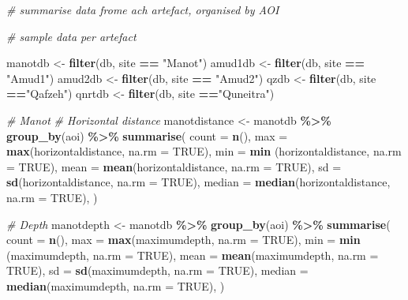 \documentclass[
]{article}
\newenvironment{Shaded}{\begin{snugshade}}{\end{snugshade}}
\newcommand{\AttributeTok}[1]{\textcolor[rgb]{0.13,0.29,0.53}{#1}}
\newcommand{\CommentTok}[1]{\textcolor[rgb]{0.56,0.35,0.01}{\textit{#1}}}
\newcommand{\ConstantTok}[1]{\textcolor[rgb]{0.56,0.35,0.01}{#1}}
\newcommand{\FunctionTok}[1]{\textcolor[rgb]{0.13,0.29,0.53}{\textbf{#1}}}
\newcommand{\NormalTok}[1]{#1}
\newcommand{\OtherTok}[1]{\textcolor[rgb]{0.56,0.35,0.01}{#1}}
\newcommand{\SpecialCharTok}[1]{\textcolor[rgb]{0.81,0.36,0.00}{\textbf{#1}}}
\newcommand{\StringTok}[1]{\textcolor[rgb]{0.31,0.60,0.02}{#1}}
\begin{document}
\begin{Shaded}
\begin{Highlighting}[]
\CommentTok{\# summarise data frome ach artefact, organised by AOI}

\CommentTok{\# sample data per artefact}

\NormalTok{manotdb }\OtherTok{\textless{}{-}} \FunctionTok{filter}\NormalTok{(db, site }\SpecialCharTok{==} \StringTok{"Manot"}\NormalTok{)}
\NormalTok{amud1db }\OtherTok{\textless{}{-}} \FunctionTok{filter}\NormalTok{(db, site }\SpecialCharTok{==} \StringTok{"Amud1"}\NormalTok{)}
\NormalTok{amud2db }\OtherTok{\textless{}{-}} \FunctionTok{filter}\NormalTok{(db, site }\SpecialCharTok{==} \StringTok{"Amud2"}\NormalTok{)}
\NormalTok{qzdb }\OtherTok{\textless{}{-}} \FunctionTok{filter}\NormalTok{(db, site }\SpecialCharTok{==}\StringTok{"Qafzeh"}\NormalTok{)}
\NormalTok{qnrtdb }\OtherTok{\textless{}{-}} \FunctionTok{filter}\NormalTok{(db, site }\SpecialCharTok{==}\StringTok{"Quneitra"}\NormalTok{)}

\CommentTok{\# Manot}
\CommentTok{\# Horizontal distance}
\NormalTok{manotdistance }\OtherTok{\textless{}{-}}\NormalTok{ manotdb }\SpecialCharTok{\%\textgreater{}\%} \FunctionTok{group\_by}\NormalTok{(aoi) }\SpecialCharTok{\%\textgreater{}\%}
      \FunctionTok{summarise}\NormalTok{(}
      \AttributeTok{count =} \FunctionTok{n}\NormalTok{(),}
      \AttributeTok{max =} \FunctionTok{max}\NormalTok{(horizontaldistance, }\AttributeTok{na.rm =} \ConstantTok{TRUE}\NormalTok{),}
      \AttributeTok{min =} \FunctionTok{min}\NormalTok{ (horizontaldistance, }\AttributeTok{na.rm =} \ConstantTok{TRUE}\NormalTok{),}
      \AttributeTok{mean =} \FunctionTok{mean}\NormalTok{(horizontaldistance, }\AttributeTok{na.rm =} \ConstantTok{TRUE}\NormalTok{),}
      \AttributeTok{sd =} \FunctionTok{sd}\NormalTok{(horizontaldistance, }\AttributeTok{na.rm =} \ConstantTok{TRUE}\NormalTok{),}
      \AttributeTok{median =} \FunctionTok{median}\NormalTok{(horizontaldistance, }\AttributeTok{na.rm =} \ConstantTok{TRUE}\NormalTok{),}
\NormalTok{  ) }

\CommentTok{\# Depth}
\NormalTok{manotdepth }\OtherTok{\textless{}{-}}\NormalTok{ manotdb }\SpecialCharTok{\%\textgreater{}\%} \FunctionTok{group\_by}\NormalTok{(aoi) }\SpecialCharTok{\%\textgreater{}\%}
      \FunctionTok{summarise}\NormalTok{(}
      \AttributeTok{count =} \FunctionTok{n}\NormalTok{(),}
      \AttributeTok{max =} \FunctionTok{max}\NormalTok{(maximumdepth, }\AttributeTok{na.rm =} \ConstantTok{TRUE}\NormalTok{),}
      \AttributeTok{min =} \FunctionTok{min}\NormalTok{ (maximumdepth, }\AttributeTok{na.rm =} \ConstantTok{TRUE}\NormalTok{),}
      \AttributeTok{mean =} \FunctionTok{mean}\NormalTok{(maximumdepth, }\AttributeTok{na.rm =} \ConstantTok{TRUE}\NormalTok{),}
      \AttributeTok{sd =} \FunctionTok{sd}\NormalTok{(maximumdepth, }\AttributeTok{na.rm =} \ConstantTok{TRUE}\NormalTok{),}
      \AttributeTok{median =} \FunctionTok{median}\NormalTok{(maximumdepth, }\AttributeTok{na.rm =} \ConstantTok{TRUE}\NormalTok{),}
\NormalTok{  ) }


\end{Highlighting}
\end{Shaded}
\end{document}
